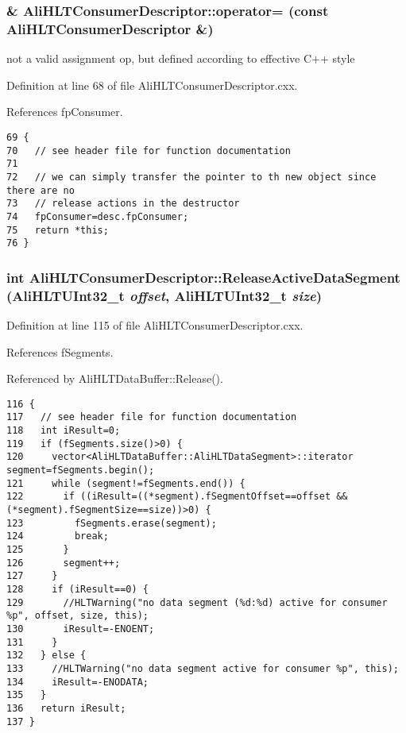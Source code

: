 \subsubsection{ \& Ali\-HLTConsumer\-Descriptor::operator= (const {\bf Ali\-HLTConsumer\-Descriptor} \&)}\label{classAliHLTConsumerDescriptor_a3}


not a valid assignment op, but defined according to effective C++ style 

Definition at line 68 of file Ali\-HLTConsumer\-Descriptor.cxx.

References fp\-Consumer.

\footnotesize\begin{verbatim}69 { 
70   // see header file for function documentation
71 
72   // we can simply transfer the pointer to th new object since there are no
73   // release actions in the destructor
74   fpConsumer=desc.fpConsumer;
75   return *this;
76 }
\end{verbatim}\normalsize 


\subsubsection{\setlength{\rightskip}{0pt plus 5cm}int Ali\-HLTConsumer\-Descriptor::Release\-Active\-Data\-Segment ({\bf Ali\-HLTUInt32\_\-t} {\em offset}, {\bf Ali\-HLTUInt32\_\-t} {\em size})}\label{classAliHLTConsumerDescriptor_a9}




Definition at line 115 of file Ali\-HLTConsumer\-Descriptor.cxx.

References f\-Segments.

Referenced by Ali\-HLTData\-Buffer::Release().

\footnotesize\begin{verbatim}116 {
117   // see header file for function documentation
118   int iResult=0;
119   if (fSegments.size()>0) {
120     vector<AliHLTDataBuffer::AliHLTDataSegment>::iterator segment=fSegments.begin();
121     while (segment!=fSegments.end()) {
122       if ((iResult=((*segment).fSegmentOffset==offset && (*segment).fSegmentSize==size))>0) {
123         fSegments.erase(segment);
124         break;
125       }
126       segment++;
127     }
128     if (iResult==0) {
129       //HLTWarning("no data segment (%d:%d) active for consumer %p", offset, size, this);
130       iResult=-ENOENT;
131     }
132   } else {
133     //HLTWarning("no data segment active for consumer %p", this);
134     iResult=-ENODATA;
135   }
136   return iResult;
137 }
\end{verbatim}\normalsize 


